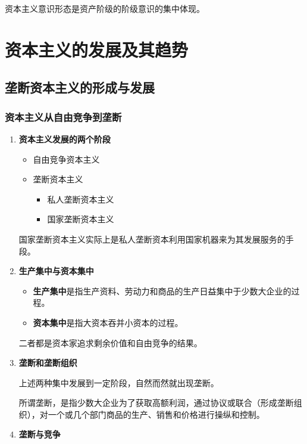 \documentclass[12pt, a4paper, oneside]{ctexart}
\begin{document}
资本主义意识形态是资产阶级的阶级意识的集中体现。

\section{资本主义的发展及其趋势}

\subsection{垄断资本主义的形成与发展}

\subsubsection{资本主义从自由竞争到垄断}

\begin{enumerate}
  \item {\bf 资本主义发展的两个阶段}

  \begin{itemize}
    \item 自由竞争资本主义
    \item 垄断资本主义
    \begin{itemize}
      \item 私人垄断资本主义
      \item 国家垄断资本主义
    \end{itemize}
  \end{itemize}

  国家垄断资本主义实际上是私人垄断资本利用国家机器来为其发展服务的手段。

  \item {\bf 生产集中与资本集中}
  
  \begin{itemize}
    \item {\bf 生产集中}是指生产资料、劳动力和商品的生产日益集中于少数大企业的过程。
    \item {\bf 资本集中}是指大资本吞并小资本的过程。
  \end{itemize}

  二者都是资本家追求剩余价值和自由竞争的结果。

  \item {\bf 垄断和垄断组织}
  
  上述两种集中发展到一定阶段，自然而然就出现垄断。

  所谓垄断，是指少数大企业为了获取高额利润，通过协议或联合（形成垄断组织），对一个或几个部门商品的生产、销售和价格进行操纵和控制。

  \item {\bf 垄断与竞争}
  

\end{enumerate}
\end{document}
